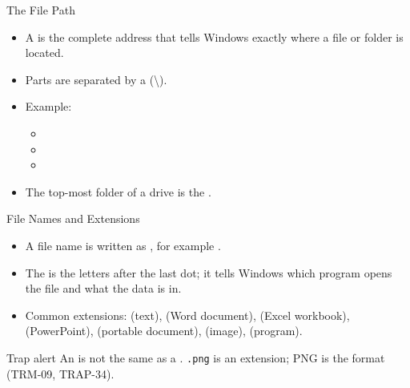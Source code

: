 \documentclass[aspectratio=169]{beamer}
\begin{document}
\begin{frame}{The File Path}
  \begin{itemize}
    \item A  is the complete address that tells Windows exactly
      where a file or folder is located.
    \item Parts are separated by a  (\textbackslash).
    \item Example: 
    \begin{itemize}
      \item {}
      \item {}
      \item {}
    \end{itemize}
    \item The top-most folder of a drive is the .
  \end{itemize}
\end{frame}

\begin{frame}{File Names and Extensions}
  \begin{itemize}
    \item A file name is written as , for example
      .
    \item The  is the letters after the last dot; it tells
      Windows which program opens the file and what  the data is
      in.
    \item Common extensions:  (text),  (Word document),
       (Excel workbook),  (PowerPoint),
       (portable document),  (image), 
      (program).
  \end{itemize}
  \begin{alertblock}{Trap alert}
    An  is not the same as a . \texttt{.png} is an
    extension; PNG is the format (TRM-09, TRAP-34).
  \end{alertblock}
\end{frame}
\end{document}
